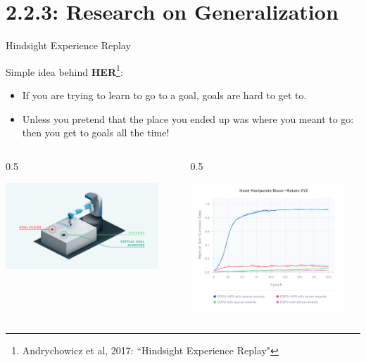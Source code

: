 \documentclass[9pt]{beamer}
\newcommand{\twocolumns}[4]{
\begin{columns}
\begin{column}{#1\textwidth}
    #3
\end{column}
\begin{column}{#2\textwidth}
	#4
\end{column}
\end{columns}
}
\begin{document}
\section{2.2.3: Research on Generalization}

\begin{frame}{Hindsight Experience Replay}

Simple idea behind \textbf{HER}\footnote{Andrychowicz et al, 2017: ``Hindsight Experience Replay"}: 
\begin{itemize}
\item If you are trying to learn to go to a goal, goals are hard to get to. 
\item Unless you pretend that the place you ended up was where you meant to go: then you get to goals all the time!
\end{itemize}

\twocolumns{0.5}{0.5}{
\begin{center}
\includegraphics[width=0.9\textwidth]{p2-her}
\end{center}
}{
\begin{center}
\includegraphics[width=0.9\textwidth]{p2-her2}
\end{center}
}
\end{frame}
\end{document}
